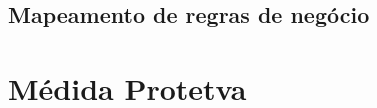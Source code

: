 \documentclass[
	12pt,				%
    oneside,			%
	a4paper,			%
	chapter=TITLE,		%
	english,			%
	french,				%
	spanish,			%
	brazil,				%
	]{abntex2}
\begin{document}
	
	\section{Mapeamento de regras de negócio}	
	



\postextual



%
%


\begin{apendicesenv}

\partapendices




\end{apendicesenv}




\printindex

\chapter*[Médida Protetva]{Médida Protetva}
\label{formulado-identificacao}
\end{document}
